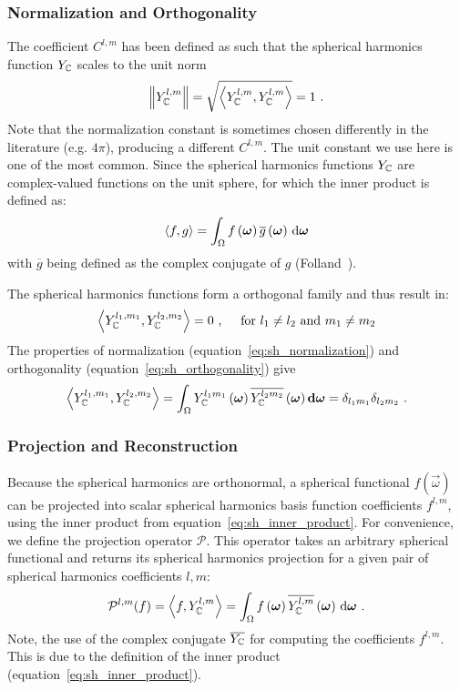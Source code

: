 \subsubsection*{Normalization and Orthogonality}

The coefficient $C^{l,m}$ has been defined as such that the spherical harmonics function $Y_{\mathbb{C}}$ scales to the unit norm
\begin{align}
\label{eq:sh_normalization}
\left\lVert Y_{\mathbb{C}}^{l,m}\right\rVert = \sqrt{\left<Y_{\mathbb{C}}^{l,m}, Y_{\mathbb{C}}^{l,m}\right>} = 1
\ .
\end{align}
Note that the normalization constant is sometimes chosen differently in the literature (e.g. $4\pi$), producing a different $C^{l,m}$. The unit constant we use here is one of the most common. Since the spherical harmonics functions $Y_{\mathbb{C}}$ are complex-valued functions on the unit sphere, for which the inner product is defined as:
\begin{align}
\label{eq:sh_inner_product}
\left<f,g\right> = \int_\Omega f\left(\boldsymbol{\mathbf{\omega}}\right)\overline{g}\left(\boldsymbol{\mathbf{\omega}}\right)\,\mathrm{d}\boldsymbol{\mathbf{\omega}}
\end{align}
with $\overline{g}$ being defined as the complex conjugate of $g$ (Folland~\cite{Folland92}).

The spherical harmonics functions form a orthogonal family and thus result in:
\begin{align}
\left<Y_{\mathbb{C}}^{l_1, m_1},Y_{\mathbb{C}}^{l_2, m_2}\right>
=
0
\ ,\quad\text{ for } l_1 \ne l_2 \text{ and } m_1 \ne m_2
\end{align}
The properties of normalization (equation~\ref{eq:sh_normalization}) and orthogonality (equation~\ref{eq:sh_orthogonality}) give
\begin{align}
\label{eq:sh_orthogonality}
\left<Y_{\mathbb{C}}^{l_1, m_1},Y_{\mathbb{C}}^{l_2, m_2}\right>=
\int_{\Omega} Y_{\mathbb{C}}^{l_1m_1}\left(\boldsymbol{\mathbf{\omega}}\right) \overline{Y_{\mathbb{C}}^{l_2m_2}}\left(\boldsymbol{\mathbf{\omega}}\right) \mathbf{d}\boldsymbol{\mathbf{\omega}} = \delta_{l_1m_1}\delta_{l_2m_2}
\ .
\end{align}

\subsubsection*{Projection and Reconstruction}

Because the spherical harmonics are orthonormal, a spherical functional $f\left(\vec{\omega}\right)$ can be projected into scalar spherical harmonics basis function coefficients $f^{l,m}$, using the inner product from equation~\ref{eq:sh_inner_product}. For convenience, we define the projection operator $\mathcal{P}$. This operator takes an arbitrary spherical functional and returns its spherical harmonics projection for a given pair of spherical harmonics coefficients $l,m$:
\begin{align}
\label{eq:sh_projection}
\mathcal{P}^{l, m}(f) =  \left<f,Y_{\mathbb{C}}^{l, m}\right> = 
\int_\Omega f\left(\boldsymbol{\mathbf{\omega}}\right)\overline{Y_{\mathbb{C}}^{l,m}}\left(\boldsymbol{\mathbf{\omega}}\right)\,\mathrm{d}\boldsymbol{\mathbf{\omega}}
\ .
\end{align}
Note, the use of the complex conjugate $\overline{Y_{\mathbb{C}}}$ for computing the coefficients $f^{l,m}$. This is due to the definition of the inner product (equation~\ref{eq:sh_inner_product}). 

